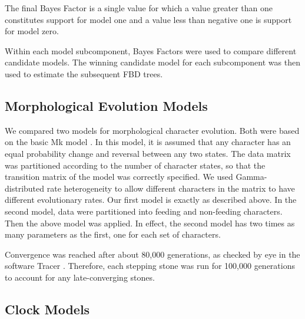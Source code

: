 \documentclass{article}
\begin{document}
The final Bayes Factor is a single value for which a value greater than one constitutes support for model one and a value less than negative one is support for model zero. 

 Within each model subcomponent, Bayes Factors were used to compare different candidate models. 
The winning candidate model for each subcomponent was then used to estimate the subsequent FBD trees.

\subsection{Morphological Evolution Models}

We compared two models for morphological character evolution. 
Both were based on the basic Mk model \citep{Lewis2001}. 
In this model, it is assumed that any character has an equal probability change and reversal between any two states. 
The data matrix was partitioned according to the number of character states, so that the transition matrix of the model was correctly specified.
We used Gamma-distributed rate heterogeneity to allow different characters in the matrix to have different evolutionary rates.
Our first model is exactly as described above. 
In the second model, data were partitioned into feeding and non-feeding characters.
Then the above model was applied.
In effect, the second model has two times as many parameters as the first, one for each set of characters.

Convergence was reached after about 80,000 generations, as checked by eye in the software Tracer \citep{Rambaut2018}. 
Therefore, each stepping stone was run for 100,000 generations to account for any late-converging stones.

\subsection{Clock Models}
\end{document}
